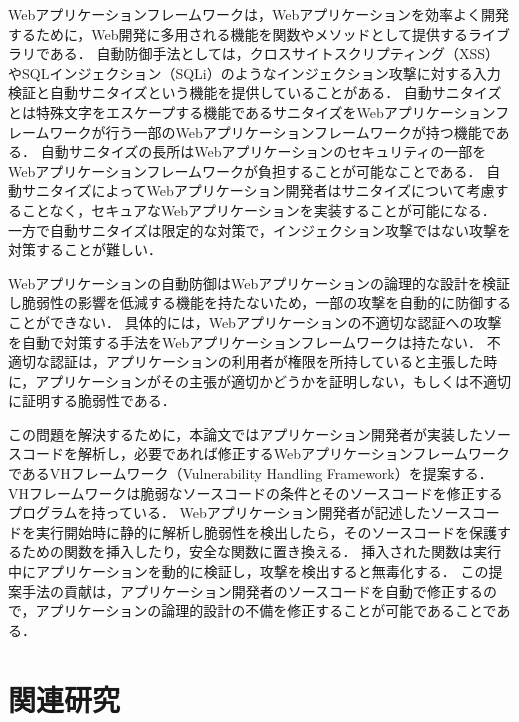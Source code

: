 \documentclass[a4paper,12pt]{jreport}
\begin{document}
Webアプリケーションフレームワークは，Webアプリケーションを効率よく開発するために，Web開発に多用される機能を関数やメソッドとして提供するライブラリである．
自動防御手法としては，クロスサイトスクリプティング（XSS）やSQLインジェクション（SQLi）のようなインジェクション攻撃に対する入力検証と自動サニタイズという機能を提供していることがある．
自動サニタイズとは特殊文字をエスケープする機能であるサニタイズをWebアプリケーションフレームワークが行う一部のWebアプリケーションフレームワークが持つ機能である．
自動サニタイズの長所はWebアプリケーションのセキュリティの一部をWebアプリケーションフレームワークが負担することが可能なことである．
自動サニタイズによってWebアプリケーション開発者はサニタイズについて考慮することなく，セキュアなWebアプリケーションを実装することが可能になる．
一方で自動サニタイズは限定的な対策で，インジェクション攻撃ではない攻撃を対策することが難しい．

Webアプリケーションの自動防御はWebアプリケーションの論理的な設計を検証し脆弱性の影響を低減する機能を持たないため，一部の攻撃を自動的に防御することができない．
具体的には，Webアプリケーションの不適切な認証への攻撃を自動で対策する手法をWebアプリケーションフレームワークは持たない．
不適切な認証は，アプリケーションの利用者が権限を所持していると主張した時に，アプリケーションがその主張が適切かどうかを証明しない，もしくは不適切に証明する脆弱性である．

この問題を解決するために，本論文ではアプリケーション開発者が実装したソースコードを解析し，必要であれば修正するWebアプリケーションフレームワークであるVHフレームワーク（Vulnerability Handling Framework）を提案する．
VHフレームワークは脆弱なソースコードの条件とそのソースコードを修正するプログラムを持っている．
Webアプリケーション開発者が記述したソースコードを実行開始時に静的に解析し脆弱性を検出したら，そのソースコードを保護するための関数を挿入したり，安全な関数に置き換える．
挿入された関数は実行中にアプリケーションを動的に検証し，攻撃を検出すると無毒化する．
この提案手法の貢献は，アプリケーション開発者のソースコードを自動で修正するので，アプリケーションの論理的設計の不備を修正することが可能であることである．





\chapter{関連研究}
\end{document}
